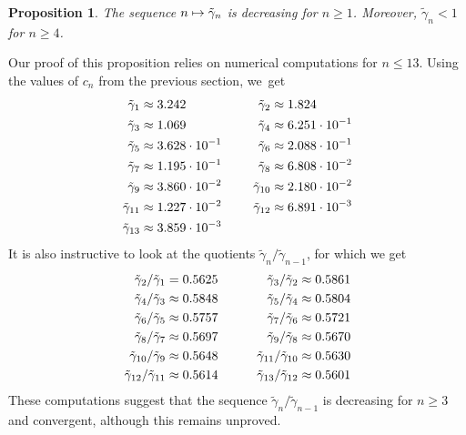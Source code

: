 \documentclass[JEP,XML,SOM,Unicode,published]{cedram}
\newcommand\mto{\mathchoice{\longmapsto}{\mapsto}{\mapsto}{\mapsto}}
\newtheorem{proposition}[theorem]{Proposition}
\theoremstyle{definition}
\newcommand{\1}{\mathbbm{1}}
\begin{document}
\begin{proposition}\label{gammatildemono}
The sequence $n\mto \tilde\gamma_n$ is decreasing for $n\geq 1$. Moreover, $\tilde\gamma_n<1$ for $n\geq 4$.
\end{proposition}

Our proof of this proposition relies on numerical computations for $n\leq 13$. Using the values of $c_n$ from the previous section, we~get
\[
\begin{aligned}
\tilde\gamma_1 & \approx 3.242&
\tilde\gamma_2 & \approx 1.824\\
\tilde\gamma_3 & \approx 1.069&
\tilde\gamma_4 &\approx 6.251 \cdot 10^{-1} \\
\tilde\gamma_5 &\approx 3.628 \cdot 10^{-1} &
\tilde\gamma_6 & \approx  2.088 \cdot 10^{-1} \\
\tilde\gamma_7 & \approx 1.195\cdot 10^{-1} &
\tilde\gamma_8 & \approx  6.808\cdot 10^{-2} \\
\tilde\gamma_9 & \approx  3.860\cdot10^{-2} &
\tilde\gamma_{10} & \approx 2.180 \cdot 10^{-2} \\
\tilde\gamma_{11} &\approx 1.227\cdot 10^{-2} &
\tilde\gamma_{12} &\approx 6.891\cdot 10^{-3}  \\
\tilde\gamma_{13} & \approx 3.859\cdot 10^{-3}&\hspace*{1cm}
\end{aligned}
\]
It is also instructive to look at the quotients $\tilde\gamma_n/\tilde\gamma_{n-1}$, for which we get
\[
\begin{aligned}
\tilde\gamma_2/\tilde\gamma_1 & =  0.5625 &\hspace*{1cm}
\tilde\gamma_3/\tilde\gamma_2 & \approx 0.5861 \\
\tilde\gamma_4/\tilde\gamma_3 & \approx 0.5848 & \tilde\gamma_5/\tilde\gamma_4 & \approx 0.5804 \\
\tilde\gamma_6/\tilde\gamma_5 & \approx 0.5757 &
\tilde\gamma_7/\tilde\gamma_6& \approx 0.5721 \\
\tilde\gamma_8/\tilde\gamma_7& \approx0.5697&
\tilde\gamma_9/\tilde\gamma_8& \approx0.5670\\
\tilde\gamma_{10}/\tilde\gamma_9& \approx 0.5648&
\tilde\gamma_{11}/\tilde\gamma_{10}& \approx0.5630\\
\tilde\gamma_{12}/\tilde\gamma_{11}& \approx0.5614&
\tilde\gamma_{13}/\tilde\gamma_{12}& \approx0.5601
\end{aligned}
\]
These computations suggest that the sequence $\tilde\gamma_n/\tilde\gamma_{n-1}$ is decreasing for $n\geq 3$ and convergent, although this remains unproved.
\end{document}
